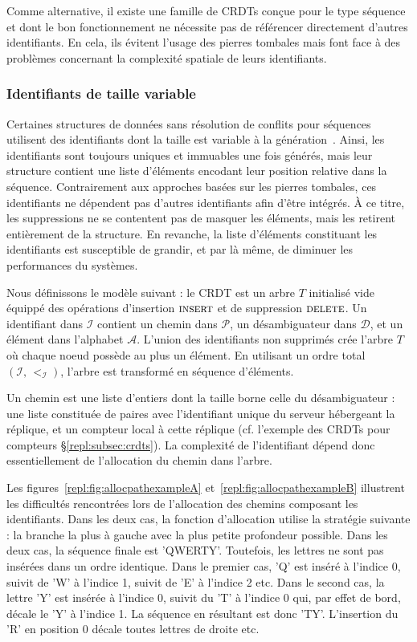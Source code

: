 Comme alternative, il existe une famille de CRDTs conçue pour le type séquence
et dont le bon fonctionnement ne nécessite pas de référencer directement
d'autres identifiants. En cela, ils évitent l'usage des pierres tombales mais
font face à des problèmes concernant la complexité spatiale de leurs
identifiants.

\subsubsection{Identifiants de taille variable}
\label{repl:subsubsec:variable}

Certaines structures de données sans résolution de conflits pour séquences
utilisent des identifiants dont la taille est variable à la
génération~\cite{andre2013supporting, preguica2009commutative,
  weiss2009logoot}. Ainsi, les identifiants sont toujours uniques et immuables
une fois générés, mais leur structure contient une liste d'éléments encodant
leur position relative dans la séquence.  Contrairement aux approches basées sur
les pierres tombales, ces identifiants ne dépendent pas d'autres identifiants
afin d'être intégrés. À ce titre, les suppressions ne se contentent pas de
masquer les éléments, mais les retirent entièrement de la structure. En
revanche, la liste d'éléments constituant les identifiants est susceptible de
grandir, et par là même, de diminuer les performances du systèmes.

Nous définissons le modèle suivant : le CRDT est un arbre $T$ initialisé vide
équippé des opérations d'insertion $\textsc{insert}$ et de suppression
$\textsc{delete}$. Un identifiant dans $\mathcal{I}$ contient un chemin dans
$\mathcal{P}$, un désambiguateur dans $\mathcal{D}$, et un élément dans
l'alphabet $\mathcal{A}$. L'union des identifiants non supprimés crée l'arbre
$T$ où chaque noeud possède au plus un élément.  En utilisant un ordre total
$(\mathcal{I},\, <_\mathcal{I})$, l'arbre est transformé en séquence d'éléments.

Un chemin est une liste d'entiers dont la taille borne celle du désambiguateur :
une liste constituée de paires avec l'identifiant unique du serveur hébergeant
la réplique, et un compteur local à cette réplique (cf. l'exemple des CRDTs pour
compteurs §\ref{repl:subsec:crdts}). La complexité de l'identifiant dépend donc
essentiellement de l'allocation du chemin dans l'arbre.

Les figures~\ref{repl:fig:allocpathexampleA} et~\ref{repl:fig:allocpathexampleB}
illustrent les difficultés rencontrées lors de l'allocation des chemins
composant les identifiants. Dans les deux cas, la fonction d'allocation utilise
la stratégie suivante : la branche la plus à gauche avec la plus petite
profondeur possible. Dans les deux cas, la séquence finale est
'QWERTY'. Toutefois, les lettres ne sont pas insérées dans un ordre
identique. Dans le premier cas, 'Q' est inséré à l'indice 0, suivit de 'W' à
l'indice 1, suivit de 'E' à l'indice 2 etc.  Dans le second cas, la lettre 'Y'
est insérée à l'indice 0, suivit du 'T' à l'indice 0 qui, par effet de bord,
décale le 'Y' à l'indice 1. La séquence en résultant est donc 'TY'. L'insertion
du 'R' en position 0 décale toutes lettres de droite etc.

